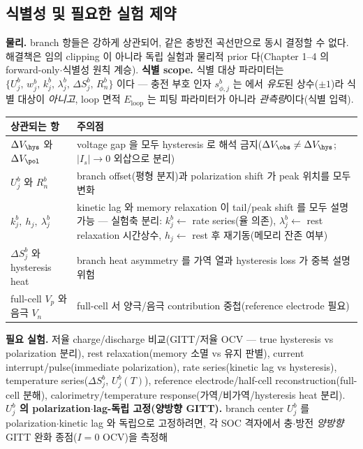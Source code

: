 \subsection{식별성 및 필요한 실험 제약}\label{sec:ch5_ident}
\textbf{물리.} branch 항들은 강하게 상관되어, 같은 충방전 곡선만으로 동시 결정할 수 없다. 해결책은 임의
clipping 이 아니라 독립 실험과 물리적 prior 다(Chapter 1--4 의 forward-only$\cdot$식별성 원칙 계승).
\textbf{식별 scope.} 식별 대상 파라미터는 $\{U_j^b,\,w_j^b,\,k_j^b,\,\lambda_j^b,\,\Delta S_j^b,\,R_n^b\}$ 이다 —
충전 부호 인자 $s_{\phi,j}^b$ 는  에서 \emph{유도}된 상수($\pm1$)라 식별 대상이 \emph{아니고}, loop 면적
$E_{\mathrm{loop}}$ 는 피팅 파라미터가 아니라 \emph{관측량}이다(식별 입력).
\begin{longtable}{p{} >{\raggedright\arraybackslash}p{}}
\toprule 상관되는 항 & 주의점 \\ \midrule \endhead
$\Delta V_\hys$ 와 $\Delta V_\pol$ & voltage gap 을 모두 hysteresis 로 해석 금지($\Delta V_\obs\ne\Delta V_\hys$; $|I_s|\to0$ 외삽으로 분리) \\
$U_j^b$ 와 $R_n^b$ & branch offset(평형 분지)과 polarization shift 가 peak 위치를 모두 변화 \\
$k_j^b,\ h_j,\ \lambda_j^b$ & kinetic lag 와 memory relaxation 이 tail/peak shift 를 모두 설명 가능 — 실험축 분리: $k_j^b\leftarrow$ rate series(율 의존), $\lambda_j^b\leftarrow$ rest relaxation 시간상수, $h_j\leftarrow$ rest 후 재기동(메모리 잔존 여부) \\
$\Delta S_j^b$ 와 hysteresis heat & branch heat asymmetry 를 가역 열과 hysteresis loss 가 중복 설명 위험 \\
full-cell $V_p$ 와 음극 $V_n$ & full-cell 서 양극/음극 contribution 중첩(reference electrode 필요) \\
\bottomrule
\end{longtable}
\textbf{필요 실험.} 저율 charge/discharge 비교(GITT/저율 OCV — true hysteresis vs polarization 분리), rest
relaxation(memory 소멸 vs 유지 판별), current interrupt/pulse(immediate polarization), rate series(kinetic
lag vs hysteresis), temperature series($\Delta S_j^b$, $U_j^b(T)$), reference electrode/half-cell
reconstruction(full-cell 분해), calorimetry/temperature response(가역/비가역/hysteresis heat 분리).
\textbf{$U_j^b$ 의 polarization$\cdot$lag-독립 고정(양방향 GITT).} branch center $U_j^b$ 를 polarization$\cdot$kinetic
lag 와 독립으로 고정하려면, 각 SOC 격자에서 충$\cdot$방전 \emph{양방향} GITT 완화 종점($I=0$ OCV)을 측정해
